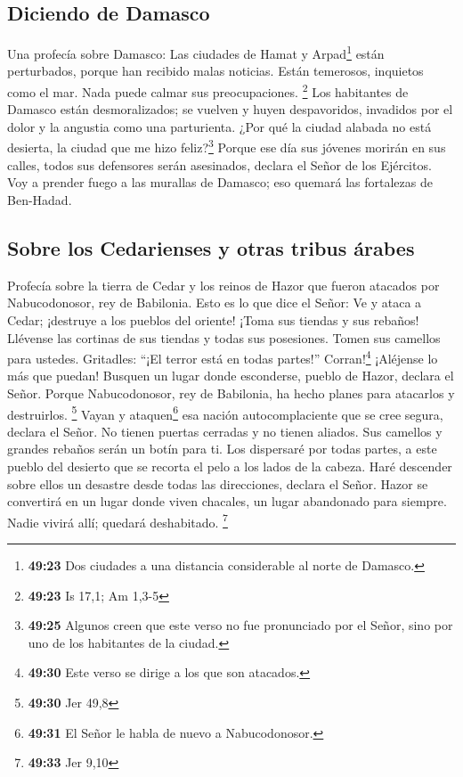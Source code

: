 \hypertarget{diciendo-de-damasco}{%
\subsection{Diciendo de Damasco}\label{diciendo-de-damasco}}

 Una profecía sobre Damasco: Las ciudades de Hamat y
Arpad\footnote{\textbf{49:23} Dos ciudades a una distancia considerable
  al norte de Damasco.} están perturbados, porque han recibido malas
noticias. Están temerosos, inquietos como el mar. Nada puede calmar sus
preocupaciones. \footnote{\textbf{49:23} Is 17,1; Am 1,3-5}
 Los habitantes de Damasco están desmoralizados; se
vuelven y huyen despavoridos, invadidos por el dolor y la angustia como
una parturienta.  ¿Por qué la ciudad alabada no está
desierta, la ciudad que me hizo feliz?\footnote{\textbf{49:25} Algunos
  creen que este verso no fue pronunciado por el Señor, sino por uno de
  los habitantes de la ciudad.}  Porque ese día sus
jóvenes morirán en sus calles, todos sus defensores serán asesinados,
declara el Señor de los Ejércitos.  Voy a prender fuego a
las murallas de Damasco; eso quemará las fortalezas de Ben-Hadad.

\hypertarget{sobre-los-cedarienses-y-otras-tribus-uxe1rabes}{%
\subsection{Sobre los Cedarienses y otras tribus
árabes}\label{sobre-los-cedarienses-y-otras-tribus-uxe1rabes}}

 Profecía sobre la tierra de Cedar y los reinos de Hazor
que fueron atacados por Nabucodonosor, rey de Babilonia. Esto es lo que
dice el Señor: Ve y ataca a Cedar; ¡destruye a los pueblos del oriente!
 ¡Toma sus tiendas y sus rebaños! Llévense las cortinas
de sus tiendas y todas sus posesiones. Tomen sus camellos para ustedes.
Gritadles: ``¡El terror está en todas partes!'' 
Corran!\footnote{\textbf{49:30} Este verso se dirige a los que son
  atacados.} ¡Aléjense lo más que puedan! Busquen un lugar donde
esconderse, pueblo de Hazor, declara el Señor. Porque Nabucodonosor, rey
de Babilonia, ha hecho planes para atacarlos y destruirlos. \footnote{\textbf{49:30}
  Jer 49,8}  Vayan y ataquen\footnote{\textbf{49:31} El
  Señor le habla de nuevo a Nabucodonosor.} esa nación autocomplaciente
que se cree segura, declara el Señor. No tienen puertas cerradas y no
tienen aliados.  Sus camellos y grandes rebaños serán un
botín para ti. Los dispersaré por todas partes, a este pueblo del
desierto que se recorta el pelo a los lados de la cabeza. Haré descender
sobre ellos un desastre desde todas las direcciones, declara el Señor.
 Hazor se convertirá en un lugar donde viven chacales, un
lugar abandonado para siempre. Nadie vivirá allí; quedará deshabitado.
\footnote{\textbf{49:33} Jer 9,10}

